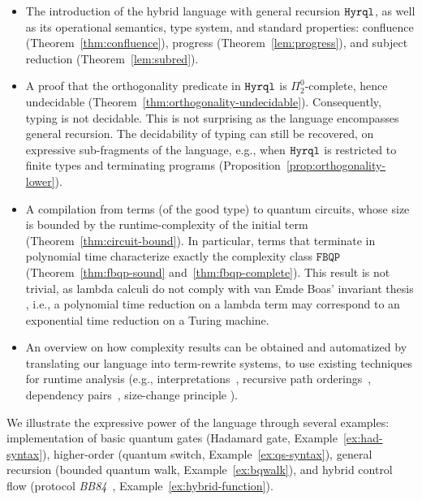 \documentclass[10pt,a4paper]{article}
\newcommand{\hyrql}{{{\tt{Hyrql}}}}
\newcommand{\fbqp}{\ensuremath{\mathtt{FBQP}}}
\begin{document}
\begin{itemize}
  \item The introduction of the hybrid language with general recursion $\hyrql$,
    as well as its operational semantics, type system, and
    standard properties: confluence (Theorem~\ref{thm:confluence}), progress
    (Theorem~\ref{lem:progress}), and subject reduction
    (Theorem~\ref{lem:subred}).
  \item A proof that the orthogonality predicate in $\hyrql$ is
    $\Pi^0_2$-complete, hence undecidable
    (Theorem~\ref{thm:orthogonality-undecidable}). Consequently, typing is not
    decidable. This is not surprising as the language encompasses general
    recursion. The decidability of typing can still be recovered, on expressive
    sub-fragments of the language, e.g., when $\hyrql$ is restricted to finite
    types and terminating programs (Proposition~\ref{prop:orthogonality-lower}).
  \item A compilation from terms (of the good type) to quantum circuits, whose
    size is bounded by the runtime-complexity of the initial term
    (Theorem~\ref{thm:circuit-bound}). In particular, terms that terminate in
    polynomial time characterize exactly the complexity class \fbqp{}
    (Theorem~\ref{thm:fbqp-sound} and~\ref{thm:fbqp-complete}). This result is
    not trivial, as lambda calculi do not comply with van Emde Boas' invariant
    thesis \cite{VEB90}, i.e., a polynomial time reduction on a lambda term
    may correspond to an exponential time reduction on a Turing machine.

  \item An overview on how complexity results can be obtained and
    automatized by translating our language into term-rewrite systems, to use
    existing techniques for runtime analysis (e.g.,
    interpretations~\cite{MP09}, recursive path orderings~\cite{Der82,Der87},
    dependency pairs~\cite{AG00}, size-change principle \cite{LJBA01}).
\end{itemize}

We illustrate the expressive power of the language through several examples:
implementa\-tion of basic quantum gates (Hadamard gate,
Example~\ref{ex:had-syntax}), higher-order (quantum switch,
Example~\ref{ex:qs-syntax}), general recursion (bounded quantum walk,
Example~\ref{ex:bqwalk}), and hybrid control flow (protocol
\emph{BB84}~\cite{BB84}, Example~\ref{ex:hybrid-function}).


\newcommand{\dlpz}{{\texttt{DLPZ}}}
\newcommand{\foq}{{\texttt{FOQ}}}
\newcommand{\qugcl}{{\texttt{QuGCL}}}
\newcommand{\qunity}{{\texttt{Qunity}}}
\newcommand{\rqc}{{\texttt{RQC}}}
\end{document}

